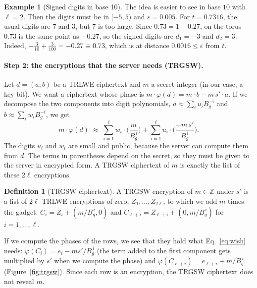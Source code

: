 \documentclass[12pt]{article}
\theoremstyle{plain}
\theoremstyle{definition}
\newtheorem{definition}{Definition}
\newtheorem{example}{Example}
\newcommand{\Z}{\mathbb{Z}}
\newcommand{\Bg}{B_g}
\begin{document}
\begin{example}[Signed digits in base 10]
\label{ex:decimal}
The idea is easier to see in base $10$ with $\ell=2$. Then the digits must be in
$[-5,5)$ and $\varepsilon=0.005$. For $t=0.7316$, the usual digits are $7$ and
$3$, but $7$ is too large. Since $0.73=1-0.27$, on the torus $0.73$ is the same
point as $-0.27$, so the signed digits are $d_1=-3$ and $d_2=3$. Indeed,
$-\frac3{10}+\frac3{100}=-0.27\equiv0.73$, which is at distance
$0.0016\le\varepsilon$ from $t$.
\end{example}

\paragraph{Step 2: the encryptions that the server needs (TRGSW).}
Let $d=(a,b)$ be a TRLWE ciphertext and $m$ a secret integer (in our case, a
key bit). We want a ciphertext whose phase is
$m\cdot\varphi(d)=m\cdot b-m\,s'\cdot a$. If we decompose the two components
into digit polynomials, $a\approx\sum_iu_i\Bg^{-i}$ and $b\approx\sum_iw_i\Bg^{-i}$,
we get
\begin{equation}
  m\cdot\varphi(d)\;\approx\;\sum_{i=1}^{\ell}w_i\cdot\Big(\frac{m}{\Bg^{\,i}}\Big)
                  +\sum_{i=1}^{\ell}u_i\cdot\Big(\frac{-m\,s'}{\Bg^{\,i}}\Big).
  \label{eq:wish}
\end{equation}
The digits $u_i$ and $w_i$ are small and public, because the server can compute
them from $d$. The terms in parentheses depend on the secret, so they must be
given to the server in encrypted form. A TRGSW ciphertext of $m$ is exactly the
list of these $2\ell$ encryptions.

\begin{definition}[TRGSW ciphertext]
A TRGSW encryption of $m\in\Z$ under $s'$ is a list of $2\ell$ TRLWE encryptions
of zero, $Z_1,\dots,Z_{2\ell}$, to which we add $m$ times the gadget:
$C_i=Z_i+(m/\Bg^{\,i},0)$ and $C_{\ell+i}=Z_{\ell+i}+(0,m/\Bg^{\,i})$ for
$i=1,\dots,\ell$.
\end{definition}

If we compute the phases of the rows, we see that they hold what
Eq.~\eqref{eq:wish} needs: $\varphi(C_i)=e_i-m s'/\Bg^{\,i}$ (the term added to
the first component gets multiplied by $s'$ when we compute the phase) and
$\varphi(C_{\ell+i})=e_{\ell+i}+m/\Bg^{\,i}$ (Figure~\ref{fig:trgsw}). Since each
row is an encryption, the TRGSW ciphertext does not reveal $m$.


\end{document}
